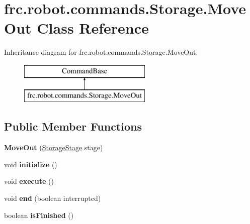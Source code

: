 \hypertarget{classfrc_1_1robot_1_1commands_1_1_storage_1_1_move_out}{}\section{frc.\+robot.\+commands.\+Storage.\+Move\+Out Class Reference}
\label{classfrc_1_1robot_1_1commands_1_1_storage_1_1_move_out}
Inheritance diagram for frc.\+robot.\+commands.\+Storage.\+Move\+Out\+:\begin{figure}[H]
\begin{center}
\leavevmode
\includegraphics[height=2.000000cm]{classfrc_1_1robot_1_1commands_1_1_storage_1_1_move_out}
\end{center}
\end{figure}
\subsection*{Public Member Functions}
\begin{DoxyCompactItemize}
\item 
\mbox{\label{classfrc_1_1robot_1_1commands_1_1_storage_1_1_move_out_aedd08a481afc9f90ead1c48d61678da0}} 
{\bfseries Move\+Out} (\mbox{\hyperlink{enumfrc_1_1robot_1_1enums_1_1_storage_stage}{Storage\+Stage}} stage)
\item 
\mbox{\label{classfrc_1_1robot_1_1commands_1_1_storage_1_1_move_out_a243dc3791578c1efe19e893281e66c38}} 
void {\bfseries initialize} ()
\item 
\mbox{\label{classfrc_1_1robot_1_1commands_1_1_storage_1_1_move_out_aaede7b6d199722dce09b0aa47a6d32c5}} 
void {\bfseries execute} ()
\item 
\mbox{\label{classfrc_1_1robot_1_1commands_1_1_storage_1_1_move_out_a226f8585182584f5d74872813383b88c}} 
void {\bfseries end} (boolean interrupted)
\item 
\mbox{\label{classfrc_1_1robot_1_1commands_1_1_storage_1_1_move_out_a6cc48f3531a36a6599e948b229ab08c0}} 
boolean {\bfseries is\+Finished} ()
\end{DoxyCompactItemize}
